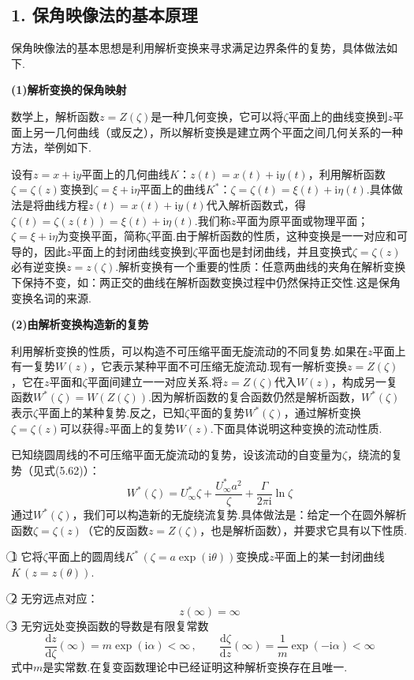\subsection*{1. 保角映像法的基本原理}

保角映像法的基本思想是利用解析变换来寻求满足边界条件的复势，具体做法如下.

\textbf{(1)解析变换的保角映射}

数学上，解析函数$z=Z(\zeta)$是一种几何变换，它可以将$\zeta$平面上的曲线变换到$z$平面上另一几何曲线（或反之），所以解析变换是建立两个平面之间几何关系的一种方法，举例如下.

设有$z=x+\mathrm{i}y$平面上的几何曲线$K$：$z(t)=x(t)+\mathrm{i}y(t)$，利用解析函数$\zeta=\zeta(z)$变换到$\zeta=\xi+\mathrm{i}\eta$平面上的曲线$K^{*}$：$\zeta=\zeta(t)=\xi(t)+\mathrm{i}\eta(t)$.具体做法是将曲线方程$z(t)=x(t)+\mathrm{i}y(t)$代入解析函数式，得$\zeta(t)=\zeta(z(t))=\xi(t)+\mathrm{i}\eta(t)$.我们称$z$平面为原平面或物理平面；$\zeta=\xi+\mathrm{i}\eta$为变换平面，简称$\zeta$平面.由于解析函数的性质，这种变换是一一对应和可导的，因此$z$平面上的封闭曲线变换到$\zeta$平面也是封闭曲线，并且变换式$\zeta=\zeta(z)$必有逆变换$z=z(\zeta)$.解析变换有一个重要的性质：任意两曲线的夹角在解析变换下保持不变，如：两正交的曲线在解析函数变换过程中仍然保持正交性.这是保角变换名词的来源.

\textbf{(2)由解析变换构造新的复势}

利用解析变换的性质，可以构造不可压缩平面无旋流动的不同复势.如果在$z$平面上有一复势$W(z)$，它表示某种平面不可压缩无旋流动.现有一解析变换$z=Z(\zeta)$，它在$z$平面和$\zeta$平面间建立一一对应关系.将$z=Z(\zeta)$代入$W(z)$，构成另一复函数$W^{*}(\zeta)=W(Z(\zeta))$.因为解析函数的复合函数仍然是解析函数，$W^{*}(\zeta)$表示$\zeta$平面上的某种复势.反之，已知$\zeta$平面的复势$W^{*}(\zeta)$，通过解析变换$\zeta=\zeta(z)$可以获得$z$平面上的复势$W(z)$.下面具体说明这种变换的流动性质.

已知绕圆周线的不可压缩平面无旋流动的复势，设该流动的自变量为$\zeta$，绕流的复势（见式(5.62)）：
\[
W^{*}(\zeta)=U_\infty^{*}\zeta+\frac{U_\infty^{*}a^{2}}{\zeta}+\frac{\Gamma}{2\pi\mathrm{i}}\ln\zeta
\]
通过$W^{*}(\zeta)$，我们可以构造新的无旋绕流复势.具体做法是：给定一个在圆外解析函数$\zeta=\zeta(z)$（它的反函数$z=Z(\zeta)$，也是解析函数），并要求它具有以下性质.

\textcircled{1} 它将$\zeta$平面上的圆周线$K^{*}\,(\zeta=a\exp(\mathrm{i}\theta))$变换成$z$平面上的某一封闭曲线$K\,(z=z(\theta))$.

\textcircled{2} 无穷远点对应：
\begin{equation*}
z(\infty)=\infty
\tag{5.67}
\end{equation*}
\textcircled{3} 无穷远处变换函数的导数是有限复常数
\begin{equation*}
\frac{\mathrm{d}z}{\mathrm{d}\zeta}(\infty)=m\exp(\mathrm{i}\alpha)<\infty\,,\qquad \frac{\mathrm{d}\zeta}{\mathrm{d}z}(\infty)=\frac{1}{m}\exp(-\mathrm{i}\alpha)<\infty
\tag{5.68}
\end{equation*}
式中$m$是实常数.在复变函数理论中已经证明这种解析变换存在且唯一.

